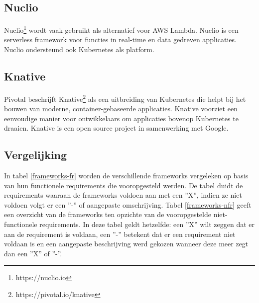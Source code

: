 \subsection{Nuclio}
Nuclio\footnote{https://nuclio.io} wordt vaak gebruikt als alternatief voor AWS Lambda. Nuclio is een serverless framework voor functies in real-time en data gedreven applicaties. Nuclio ondersteund ook Kubernetes als platform. \autocite{Nuclio2019}

\subsection{Knative}
Pivotal beschrijft Knative\footnote{https://pivotal.io/knative} als een uitbreiding van Kubernetes die helpt bij het bouwen van moderne, container-gebaseerde applicaties. Knative voorziet een eenvoudige manier voor ontwikkelaars om applicaties bovenop Kubernetes te draaien. Knative is een open source project in samenwerking met Google.

\subsection{Vergelijking}
In tabel \ref{frameworks-fr} worden de verschillende frameworks vergeleken op basis van hun functionele requirements die vooropgesteld  werden.  De tabel duidt de requirements waaraan de frameworks voldoen aan met een ''X'', indien ze niet voldoen volgt er een ''-'' of aangepaste omschrijving. Tabel \ref{frameworks-nfr} geeft een overzicht van de frameworks ten opzichte van de vooropgestelde niet-functionele requirements. In deze tabel geldt hetzelfde: een ''X'' wilt zeggen dat er aan de requirement is voldaan, een ''-'' betekent dat er een requirement niet voldaan is en een aangepaste beschrijving werd gekozen wanneer deze meer zegt dan een ''X'' of ''-''.

